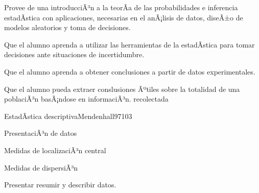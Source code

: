 
\begin{syllabus}


\begin{justification}
Provee de una introducciÃ³n a la teorÃ­a de las probabilidades e inferencia estadÃ­stica con aplicaciones, necesarias en el anÃ¡lisis de datos, diseÃ±o de modelos aleatorios y toma de decisiones.
\end{justification}

\begin{goals}
\item Que el alumno aprenda a utilizar las herramientas de la estadÃ­stica para tomar decisiones ante situaciones de incertidumbre.
\item Que el alumno aprenda a obtener conclusiones a partir de datos experimentales.
\item Que el alumno pueda extraer conslusiones Ãºtiles sobre la totalidad de una poblaciÃ³n basÃ¡ndose en informaciÃ³n. recolectada
\end{goals}

\begin{outcomes}
\end{outcomes}

\begin{unit}{EstadÃ­stica descriptiva}{Mendenhall97}{10}{3}
\begin{topics}
      \item PresentaciÃ³n de datos
      \item Medidas de localizaciÃ³n central
      \item Medidas de dispersiÃ³n
   \end{topics}

   \begin{unitgoals}
      \item Presentar resumir y describir datos.
   \end{unitgoals}
\end{unit}


\end{syllabus}
